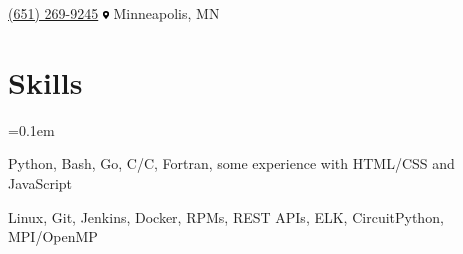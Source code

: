 \documentclass[11pt,letterpaper]{article}
\newcommand{\ResumeSection}[1]{
    \section*{ {\color{MidnightBlue}#1 \sout{\hfill} } }
}
\newcommand{\CPP}{C\nolinebreak[4]\hspace{-.05em}\raisebox{.22ex}{\footnotesize\bf ++}\xspace}
\newcommand{\hbump}{\hspace{0.32in}}
\newcommand{\hbmp}{\hspace{0.02in}}
\newcommand{\iconsize}{8px}
\begin{document}
\begin{center}
%    
    \hbmp
    \href{tel:+16512699245}{(651) 269-9245}
    \hbump
    \includegraphics[height=\iconsize]{icons/map-marker-alt-solid.pdf}
%    
    \hbmp
    Minneapolis, MN

\end{center}


\ResumeSection{Skills}

\begin{description}[leftmargin=!, labelindent=\parindent,
                    labelwidth=\widthof{\bfseries Languages}]
    \parskip=0.1em

    \item[Languages]
        Python, Bash, Go, C/\CPP, Fortran, some experience with HTML/CSS and JavaScript

    \item[Tools]
        Linux, Git, Jenkins, Docker, RPMs, REST APIs, ELK, CircuitPython, MPI/OpenMP

\end{description}
\end{document}
